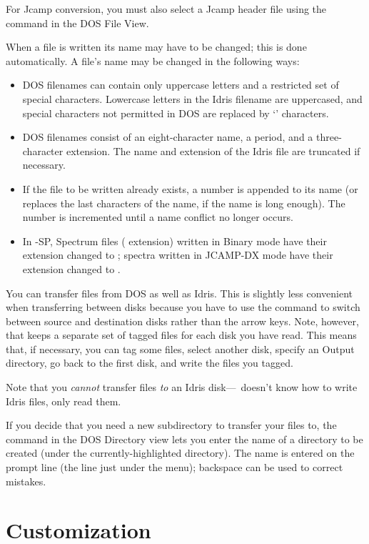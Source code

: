 For Jcamp conversion, you must also select a Jcamp header file using
the  command in the DOS File View.

When a file is written its name may have to be changed; this is done
automatically.  A file's name may be changed in the following ways:
\begin{itemize}
\item
DOS filenames can contain only uppercase letters and a restricted set
of special characters.  Lowercase letters in the Idris filename are
uppercased, and special characters not permitted in DOS are replaced
by `\code{~}' characters.
\item
DOS filenames consist of an eight-character name, a period, and a
three-character extension.  The name and extension of the Idris file
are truncated if necessary.
\item
If the file to be written already exists, a number is appended to its
name (or replaces the last characters of the name, if the name is
long enough).  The number is incremented until a name conflict no
longer occurs.
\item
In \RD-SP, Spectrum files ( extension) written in Binary
mode have their extension changed to ; spectra written in
JCAMP-DX mode have their extension changed to .
\end{itemize}

You can transfer files from DOS as well as Idris.  This is
slightly less convenient when transferring between disks because you
have to use the  command to switch between source and
destination disks rather than the arrow keys.  Note, however, that \RD
keeps a separate set of tagged files for each disk you have read.
This means that, if necessary, you can tag some files, select another
disk, specify an Output directory, go back to the first disk, and
write the files you tagged.

Note that you {\em cannot} transfer files {\em to} an Idris
disk---\RD\ doesn't know how to write Idris files, only read them.

If you decide that you need a new subdirectory to transfer your files
to, the  command in the DOS Directory view lets you enter
the name of a directory to be created (under the currently-highlighted
directory).  The name is entered on the prompt line (the line just under
the menu); backspace can be used to correct mistakes.

 
\section{Customization}
 
